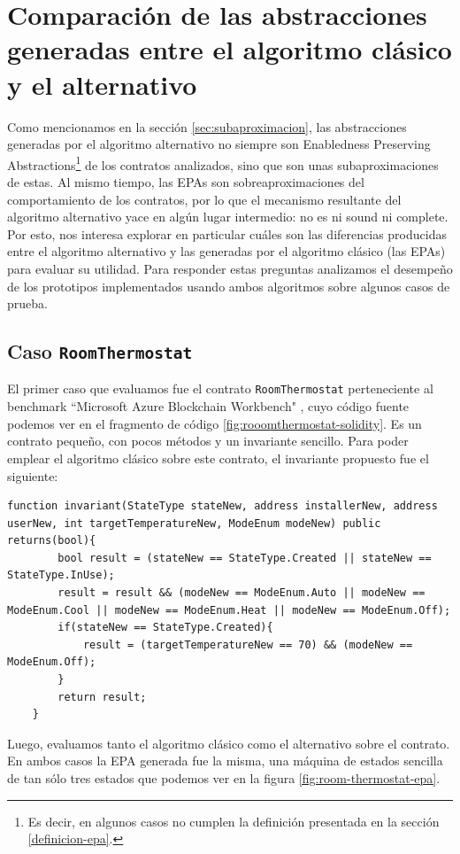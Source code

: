 \section{Comparación de las abstracciones generadas entre el algoritmo clásico y el alternativo}
Como mencionamos en la sección \ref{sec:subaproximacion}, las abstracciones generadas por el algoritmo alternativo no siempre son Enabledness Preserving Abstractions\footnote{Es decir, en algunos casos no cumplen la definición presentada en la sección \ref{definicion-epa}.} de los contratos analizados, sino que son unas subaproximaciones de estas.
Al mismo tiempo, las EPAs son sobreaproximaciones del comportamiento de los contratos, por lo que el mecanismo resultante del algoritmo alternativo yace en algún lugar intermedio: no es ni sound ni complete.
Por esto, nos interesa explorar en particular cuáles son las diferencias producidas entre el algoritmo alternativo y las generadas por el algoritmo clásico (las EPAs) para evaluar su utilidad.
Para responder estas preguntas analizamos el desempeño de los prototipos implementados usando ambos algoritmos sobre algunos casos de prueba.

\subsection{Caso \texttt{RoomThermostat}}
El primer caso que evaluamos fue el contrato \texttt{RoomThermostat} perteneciente al benchmark ``Microsoft Azure Blockchain Workbench" \cite{azure-benchmark}, cuyo código fuente podemos ver en el fragmento de código \ref{fig:rooomthermostat-solidity}.
Es un contrato pequeño, con pocos métodos y un invariante sencillo.
Para poder emplear el algoritmo clásico sobre este contrato, el invariante propuesto fue el siguiente:
\begin{lstlisting}[language=Solidity]
    function invariant(StateType stateNew, address installerNew, address userNew, int targetTemperatureNew, ModeEnum modeNew) public returns(bool){
        bool result = (stateNew == StateType.Created || stateNew == StateType.InUse);
        result = result && (modeNew == ModeEnum.Auto || modeNew == ModeEnum.Cool || modeNew == ModeEnum.Heat || modeNew == ModeEnum.Off);
        if(stateNew == StateType.Created){
            result = (targetTemperatureNew == 70) && (modeNew == ModeEnum.Off);
        }
        return result;
    }
\end{lstlisting}

Luego, evaluamos tanto el algoritmo clásico como el alternativo sobre el contrato.
En ambos casos la EPA generada fue la misma, una máquina de estados sencilla de tan sólo tres estados que podemos ver en la figura \ref{fig:room-thermostat-epa}.

